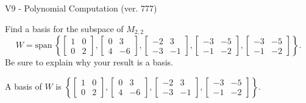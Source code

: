 \begin{exercise}
  \begin{exerciseTitle}V9 - Polynomial Computation (ver. 777)\end{exerciseTitle}
  \begin{exerciseStatement}
    Find a basis for the subspace of \(M_{2,2}\) 
\[W=\mathrm{span}\ \left\{\left[\begin{array}{cc}
1 & 0 \\
0 & 2
\end{array}\right] , \left[\begin{array}{cc}
0 & 3 \\
4 & -6
\end{array}\right] , \left[\begin{array}{cc}
-2 & 3 \\
-3 & -1
\end{array}\right] , \left[\begin{array}{cc}
-3 & -5 \\
-1 & -2
\end{array}\right] , \left[\begin{array}{cc}
-3 & -5 \\
-1 & -2
\end{array}\right]\right\}.\]
 Be sure to explain why your result is a basis.


  \end{exerciseStatement}
  \begin{exerciseAnswer}
   A basis of \(W\) is  \(\left\{\left[\begin{array}{cc}
1 & 0 \\
0 & 2
\end{array}\right] , \left[\begin{array}{cc}
0 & 3 \\
4 & -6
\end{array}\right] , \left[\begin{array}{cc}
-2 & 3 \\
-3 & -1
\end{array}\right] , \left[\begin{array}{cc}
-3 & -5 \\
-1 & -2
\end{array}\right]\right\}\).
  


  \end{exerciseAnswer}
\end{exercise}